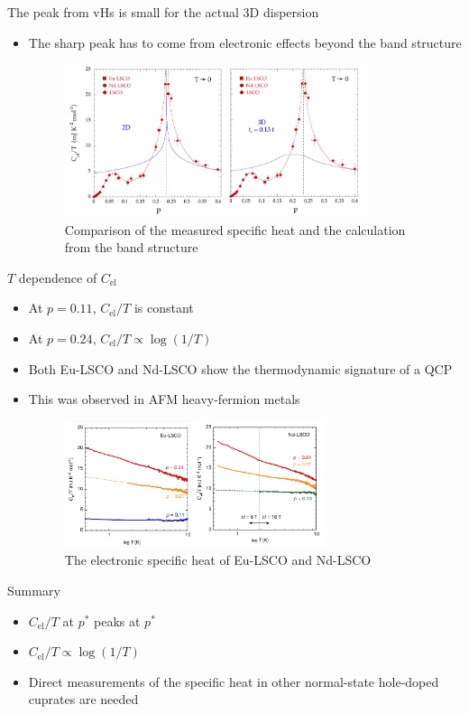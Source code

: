 \documentclass{beamer}
\begin{document}
\begin{frame}{The peak from vHs is small for the actual 3D dispersion}
\begin{itemize}
\item The sharp peak has to come from electronic effects beyond the band structure
\begin{figure}
\includegraphics[width=3.5in]{figs/c_2d_vs_3d.png}
\caption*{Comparison of the measured specific heat and the calculation from the band structure}
\end{figure}
\end{itemize}
\end{frame}

\begin{frame}{$T$ dependence of $C_{\text{el}}$}
\begin{itemize}
\item At $p = 0.11$, $C_{\text{el}}/T$ is constant
\item At $p = 0.24$, $C_{\text{el}}/T \propto \log{(1/T)}$
\item Both Eu-LSCO and Nd-LSCO show the thermodynamic signature of a QCP
\item This was observed in AFM heavy-fermion metals
\begin{figure}
\includegraphics[width=3in]{figs/c_el.png}
\caption*{The electronic specific heat of Eu-LSCO and Nd-LSCO}
\end{figure}
\end{itemize}
\end{frame}

\begin{frame}{Summary}
\begin{itemize}
\item $C_{\text{el}}/T$ at $p^{\ast}$ peaks at $p^{\ast}$
\item $C_{\text{el}}/T \propto \log{(1/T)}$
\item Direct measurements of the specific heat in other normal-state hole-doped cuprates are needed
\end{itemize}
\end{frame}
\end{document}
